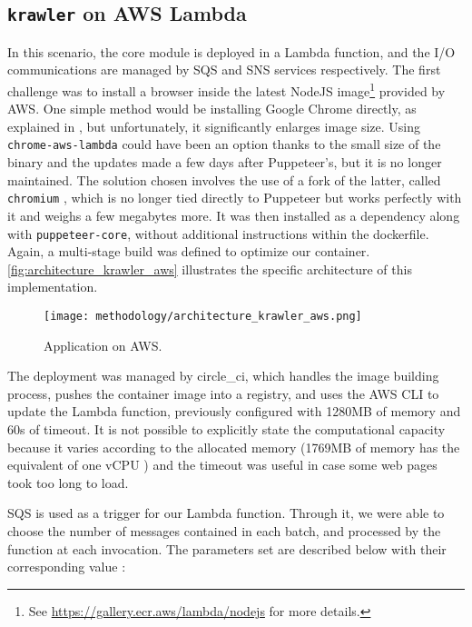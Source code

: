 \documentclass[../thesis.tex]{subfiles}
\begin{document}
\subsection{\texttt{krawler} on AWS Lambda}
In this scenario, the core module is deployed in a Lambda function, and the I/O communications are managed by \acrshort{SQS} and \acrshort{SNS} services respectively. The first challenge was to install a browser inside the latest NodeJS image\footnote{See \href{https://gallery.ecr.aws/lambda/nodejs}{https://gallery.ecr.aws/lambda/nodejs} for more details.} provided by \acrshort{AWS}. One simple method would be installing Google Chrome directly, as explained in \cite{site:universal_chrome}, but unfortunately, it significantly enlarges image size. Using \texttt{chrome-aws-lambda} \cite{site:chrome_aws_lambda} could have been an option thanks to the small size of the binary and the updates made a few days after Puppeteer's, but it is no longer maintained. The solution chosen involves the use of a fork of the latter, called \texttt{chromium} \cite{site:chromium_aws_lambda}, which is no longer tied directly to Puppeteer but works perfectly with it and weighs a few megabytes more. It was then installed as a dependency along with \texttt{puppeteer-core}, without additional instructions within the \gls{dockerfile}. Again, a multi-stage build was defined to optimize our \gls{container}. \autoref{fig:architecture_krawler_aws} illustrates the specific architecture of this implementation.

\begin{figure}[H]
    \centering
    \texttt{[image: methodology/architecture\_krawler\_aws.png]}
    \caption[AWS implementation]{Application on AWS.}
    \label{fig:architecture_krawler_aws}
\end{figure}

The deployment was managed by \gls{circle_ci}, which handles the image building process, pushes the \gls{container} image into a registry, and uses the \acrshort{AWS} \acrshort{CLI} to update the Lambda function, previously configured with 1280MB of memory and 60s of timeout. It is not possible to explicitly state the computational capacity because it varies according to the allocated memory (1769MB of memory has the equivalent of one vCPU \cite{site:lambda_memory_cpu}) and the timeout was useful in case some web pages took too long to load.

\acrshort{SQS} is used as a trigger for our Lambda function. Through it, we were able to choose the number of messages contained in each batch, and processed by the function at each invocation. The parameters set are described below with their corresponding value :
\end{document}
